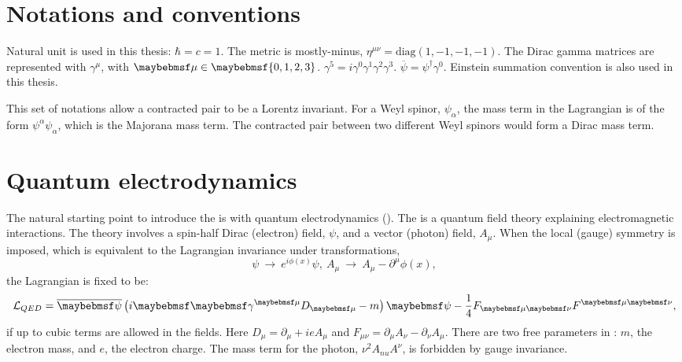 \section{Notations and conventions}

Natural unit is used in this thesis: $\hbar = c = 1$. The metric is mostly-minus, $\eta^{\mu\nu} = \text{diag}(1,-1,-1,-1)$. The Dirac gamma matrices are represented with $\gamma^{\mu}$, with $\mu\in\braces{0,1,2,3}$. $\gamma^5 = i \gamma^{0}\gamma^{1}\gamma^{2}\gamma^{3}$. $\overline{\psi} = \psi^{\dagger}\gamma^0$. Einstein summation convention is also used in this thesis.

This set of notations allow a contracted pair to be a Lorentz invariant. For a Weyl spinor, $\psi_\alpha$, the mass term in the Lagrangian is of the form $\psi^{\alpha}\psi_\alpha$, which is the Majorana mass term. The contracted pair between two different Weyl spinors would form a Dirac mass term.


\section{Quantum electrodynamics}

The natural starting point to introduce the \SM is with quantum electrodynamics (\QED). The \QED is a quantum field theory explaining electromagnetic interactions. The theory involves a spin-half Dirac (electron) field, $\psi$, and a vector (photon) field, $A_{\mu}$. When the local (gauge) symmetry is imposed, which is equivalent to the Lagrangian invariance under transformations,
\begin{equation}
\psi\ \to\ e^{i\phi(x)}\psi,\ A_{\mu}\ \to\ A_{\mu} - \partial^{\mu}\phi(x),
\end{equation}
the Lagrangian is fixed to be:
\begin{equation}
\Lagr_{QED} = \overline{\psi} \left( i\Dstroke - m \right)\psi -  \frac{1}{4}F_{\mu\nu}F^{\mu\nu},
\end{equation}
if up to cubic terms are allowed in the fields. Here $D_{\mu} = \partial_{\mu} + ieA_{\mu}$ and $F_{\mu\nu} = \partial_{\mu}A_{\nu} - \partial_{\nu}A_{\mu}$. There are two free parameters in \QED: $m$, the electron mass, and $e$, the electron charge. The mass term for the photon, $\nu^{2}A_{nu}A^{\nu}$, is forbidden by gauge invariance.

